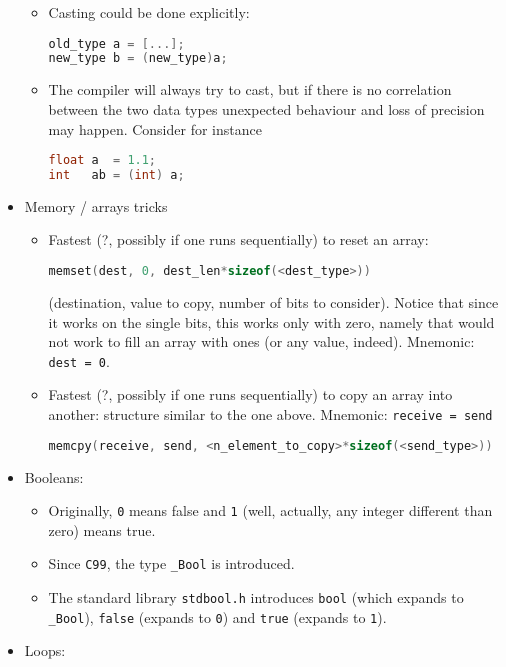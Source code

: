 \documentclass[a4paper,12pt,%
              final%
              ]{article}
\begin{document}
\begin{itemize}
\begin{itemize}
      \item Casting could be done explicitly:
\begin{lstlisting}[language=C]
old_type a = [...];
new_type b = (new_type)a;
\end{lstlisting}
      \item The compiler will always try to cast, but if there is no correlation between the two data types unexpected behaviour and loss of precision may happen. Consider for instance
\begin{lstlisting}[language=C]
float a  = 1.1;
int   ab = (int) a;
\end{lstlisting}
    \end{itemize}
  \item Memory / arrays tricks
    \begin{itemize}
      \item Fastest (?, possibly if one runs sequentially) to reset an array:
\begin{lstlisting}[language=C]
memset(dest, 0, dest_len*sizeof(<dest_type>))
\end{lstlisting}
        (destination, value to copy, number of bits to consider). Notice that since it works on the single bits, this works only with zero, namely that would not work to fill an array with ones (or any value, indeed). Mnemonic: \verb|dest = 0|.
      \item Fastest (?, possibly if one runs sequentially) to copy an array into another: structure similar to the one above. Mnemonic: \verb|receive = send|
\begin{lstlisting}[language=C]
memcpy(receive, send, <n_element_to_copy>*sizeof(<send_type>))
\end{lstlisting}
    \end{itemize}
  \item Booleans:
    \begin{itemize}
      \item Originally, \verb|0| means false and \verb|1| (well, actually, any integer different than zero) means true.
      \item Since \verb|C99|, the type \verb|_Bool| is introduced.
      \item The standard library \verb|stdbool.h| introduces \verb|bool| (which expands to \verb|_Bool|), \verb|false| (expands to \verb|0|) and \verb|true| (expands to \verb|1|).
    \end{itemize}
  \item Loops:
    \begin{itemize}

\end{itemize}
\end{itemize}
\end{document}
